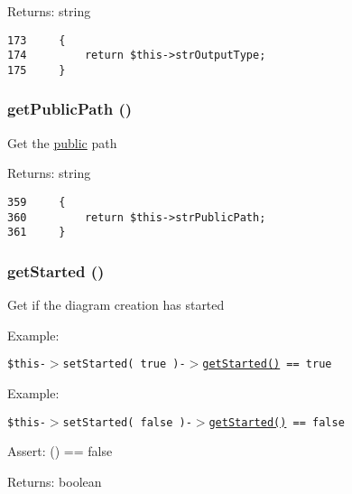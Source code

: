\begin{Desc}
\item[Returns:]string \end{Desc}


\begin{Code}\begin{verbatim}173     {
174         return $this->strOutputType;
175     }
\end{verbatim}
\end{Code}


\hypertarget{class_code_to_diagram_74df99a19bc54d630a15e1778144eb31}{
\subsubsection[{getPublicPath}]{\setlength{\rightskip}{0pt plus 5cm}getPublicPath ()}}
\label{class_code_to_diagram_74df99a19bc54d630a15e1778144eb31}


Get the \hyperlink{namespacepublic}{public} path

\begin{Desc}
\item[Returns:]string \end{Desc}


\begin{Code}\begin{verbatim}359     {
360         return $this->strPublicPath;    
361     }
\end{verbatim}
\end{Code}


\hypertarget{class_code_to_diagram_177cc628e31a482237aed841078a122f}{
\subsubsection[{getStarted}]{\setlength{\rightskip}{0pt plus 5cm}getStarted ()}}
\label{class_code_to_diagram_177cc628e31a482237aed841078a122f}


Get if the diagram creation has started \begin{Desc}
\item[Example:]\end{Desc}
{\tt  \$this-$>$setStarted( true )-$>$\hyperlink{class_code_to_diagram_177cc628e31a482237aed841078a122f}{getStarted()} == true } \begin{Desc}
\item[Example:]\end{Desc}
{\tt  \$this-$>$setStarted( false )-$>$\hyperlink{class_code_to_diagram_177cc628e31a482237aed841078a122f}{getStarted()} == false } \begin{Desc}
\item[Assert:]() == false \end{Desc}
\begin{Desc}
\item[Returns:]boolean \end{Desc}



